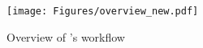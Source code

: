 


\begin{figure}[t]
	\centering
	\texttt{[image: Figures/overview\_new.pdf]}
	\caption{Overview of \tool's workflow}
	\label{fig:new1}
\end{figure}



